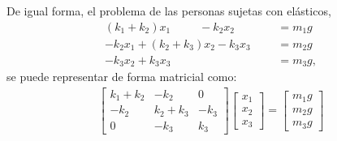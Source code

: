 \documentclass[letterpaper,10pt,english]{jupyterBook}
\begin{document}
\sphinxAtStartPar
De igual forma, el problema de las personas sujetas con elásticos,
\begin{align*}
(k_1 + k_2)x_1\;\;\;\;\;\;\;\;\; - k_2x_2 \;\;\;\;\;\;\;\;\;\;\,&=  m_1g\\
- k_2x_1 + (k_2 + k_3)x_2 - k_3x_3  &= m_2g\\
- k_3x_2 + k_3x_3 &= m_3g,
\end{align*}
\sphinxAtStartPar
se puede representar de forma matricial como:
\begin{equation*}
\begin{split}\begin{bmatrix}
k_1 + k_2 & -k_2 & 0 \\
-k_2 & k_2 + k_3 & -k_3\\
0 & -k_3 & k_3
\end{bmatrix}
\left[\begin{array}{c} x_1 \\x_2 \\ x_3 \end{array}\right] =
\left[\begin{array}{c} m_1g \\m_2g \\m_3g \end{array}\right]\end{split}
\end{equation*}
\end{document}
